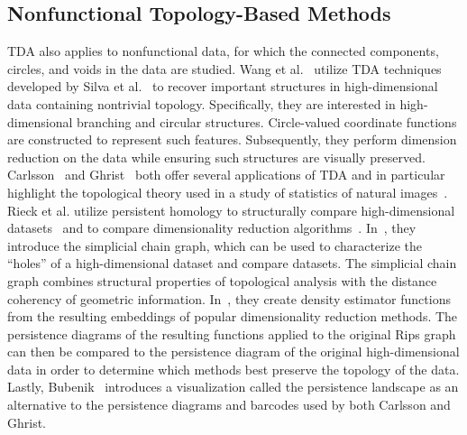 \subsection{Nonfunctional Topology-Based Methods}
TDA also applies to nonfunctional data, for which the connected components, circles, and voids in the data are studied.
%
Wang et al.~\cite{WangSummaPascucci2011} utilize TDA techniques developed by Silva et al.~\cite{SilvaMorozovVejdemo-Johansson2009} to recover important structures in high-dimensional data containing nontrivial topology.
%
Specifically, they are interested in high-dimensional branching and circular structures.
%
Circle-valued coordinate functions are constructed to represent such features.
%
Subsequently, they perform dimension reduction on the data while ensuring such structures are visually preserved.
%
Carlsson~\cite{Carlsson2009} and Ghrist~\cite{Ghrist2009} both offer several applications of TDA and in particular highlight the topological theory used in a study of statistics of natural images~\cite{LeePedersenMumford2003}.
%
Rieck et al. utilize persistent homology to structurally compare high-dimensional datasets~\cite{RieckMaraLeitte2012,RieckLeitte2014} and to compare dimensionality reduction algorithms~\cite{RieckLeitte2015}.
%
In~\cite{RieckMaraLeitte2012}, they introduce the simplicial chain graph, which can be used to characterize the ``holes'' of a high-dimensional dataset and compare datasets.
%
The simplicial chain graph combines structural properties of topological analysis with the distance coherency of geometric information.
%
In~\cite{RieckLeitte2015}, they create density estimator functions from the resulting embeddings of popular dimensionality reduction methods.
%
The persistence diagrams of the resulting functions applied to the original Rips graph can then be compared to the persistence diagram of the original high-dimensional data in order to determine which methods best preserve the topology of the data.
%
Lastly, Bubenik~\cite{Bubenik2015} introduces a visualization called the persistence landscape as an alternative to the persistence diagrams and barcodes used by both Carlsson and Ghrist.

% 